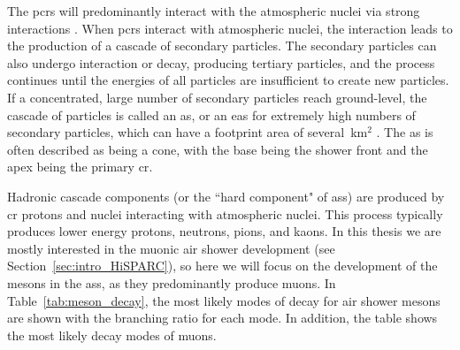 The \glspl{pcr} will predominantly interact with the atmospheric nuclei via strong interactions \citep{grupen_astroparticle_2005}. When \glspl{pcr} interact with atmospheric nuclei, the interaction leads to the production of a cascade of secondary particles. The secondary particles can also undergo interaction or decay, producing tertiary particles, and the process continues until the energies of all particles are insufficient to create new particles. If a concentrated, large number of secondary particles reach ground-level, the cascade of particles is called an \gls{as}, or an \gls{eas} for extremely high numbers of secondary particles, which can have a footprint area of several~km$^2$ \citep{fokkema_hisparc_2012, van_dam_hisparc_2020}. The \gls{as} is often described as being a cone, with the base being the shower front and the apex being the primary \gls{cr}.

Hadronic cascade components (or the ``hard component" of \glspl{as}) are produced by \gls{cr} protons and nuclei interacting with atmospheric nuclei. This process typically produces lower energy protons, neutrons, pions, and kaons. In this thesis we are mostly interested in the muonic air shower development (see Section~\ref{sec:intro_HiSPARC}), so here we will focus on the development of the mesons in the \glspl{as}, as they predominantly produce muons. In Table~\ref{tab:meson_decay}, the most likely modes of decay for air shower mesons are shown with the branching ratio for each mode. In addition, the table shows the most likely decay modes of muons.


